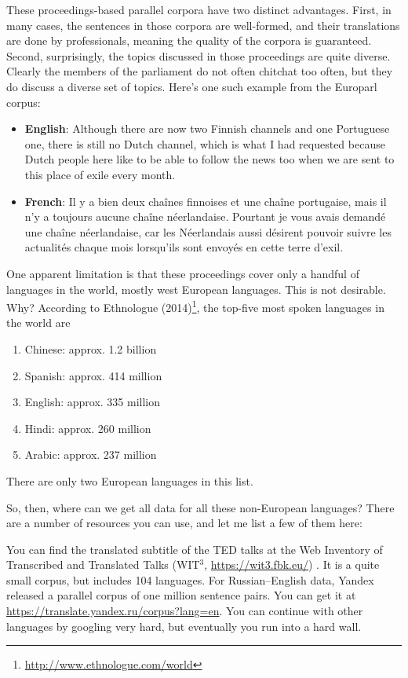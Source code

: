 \documentclass{report}
\begin{document}
These proceedings-based parallel corpora have two distinct advantages. First,
in many cases, the sentences in those corpora are well-formed, and their
translations are done by professionals, meaning the quality of the corpora is
guaranteed. Second, surprisingly, the topics discussed in those proceedings are
quite diverse. Clearly the members of the parliament do not often chitchat too
often, but they do discuss a diverse set of topics. Here's one such example from
the Europarl corpus:
\begin{itemize}
    \itemsep 0em
    \item {\bf English}: 
        Although there are now two Finnish channels and one Portuguese one, there is
        still no Dutch channel, which is what I had requested because Dutch people here
        like to be able to follow the news too when we are sent to this place of exile
        every month.
    \item {\bf French}: 
        Il y a bien deux chaînes finnoises et une chaîne portugaise, mais il n'y a
        toujours aucune chaîne néerlandaise. Pourtant je vous avais demand\'e une chaîne
        n\'eerlandaise, car les Néerlandais aussi désirent pouvoir suivre les actualités
        chaque mois lorsqu'ils sont envoyés en cette terre d'exil.
\end{itemize}

One apparent limitation is that these proceedings cover only a handful of
languages in the world, mostly west European languages. This is not desirable.
Why? According to Ethnologue (2014)\footnote{
    \url{http://www.ethnologue.com/world}
}, the top-five most spoken languages in the world are
\begin{enumerate}
    \itemsep 0em
    \item Chinese: approx. 1.2 billion
    \item Spanish: approx. 414 million
    \item English: approx. 335 million
    \item Hindi: approx. 260 million
    \item Arabic: approx. 237 million
\end{enumerate}
There are only two European languages in this list.

So, then, where can we get all data for all these non-European languages? There
are a number of resources you can use, and let me list a few of them here:

You can find the translated subtitle of the TED talks at the Web Inventory of
Transcribed and Translated Talks (WIT$^3$, \url{https://wit3.fbk.eu/})
\cite{cettoloEtAl:EAMT2012}. It is a quite small corpus, but includes 104
languages. For Russian--English data, Yandex released a parallel corpus of one
million sentence pairs. You can get it at
\url{https://translate.yandex.ru/corpus?lang=en}. You can continue with other
languages by googling very hard, but eventually you run into a hard wall.
\end{document}
